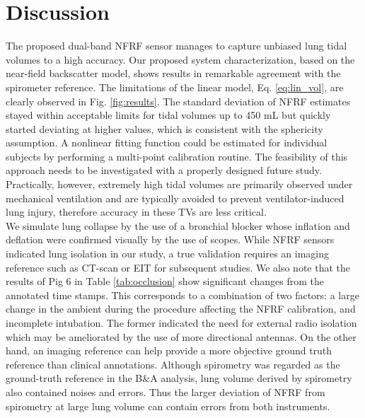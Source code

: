 \documentclass[journal]{IEEEtran}
\begin{document}
\section{Discussion}
The proposed dual-band NFRF sensor manages to capture unbiased lung tidal volumes to a high accuracy. Our proposed system characterization, based on the near-field backscatter model, shows results in remarkable agreement with the spirometer reference. The limitations of the linear model, Eq. \ref{eq:lin_vol}, are clearly observed in Fig. \ref{fig:results}. The standard deviation of NFRF estimates stayed within acceptable limits for tidal volumes up to 450 mL but quickly started deviating at higher values, which is consistent with the sphericity assumption. A nonlinear fitting function could be estimated for individual subjects by performing a multi-point calibration routine. The feasibility of this approach needs to be investigated with a properly designed future study. Practically, however, extremely high tidal volumes are primarily observed under mechanical ventilation and are typically avoided to prevent ventilator-induced lung injury, therefore accuracy in these TVs are less critical.\\
We simulate lung collapse by the use of a bronchial blocker whose inflation and deflation were confirmed visually by the use of scopes. While NFRF sensors indicated lung isolation in our study, a true validation requires an imaging reference such as CT-scan or EIT for subsequent studies. We also note that the results of Pig 6 in Table \ref{tab:occlusion} show significant changes from the annotated time stamps. This corresponds to a combination of two factors: a large change in the ambient during the procedure affecting the NFRF calibration, and incomplete intubation. The former indicated the need for external radio isolation which may be ameliorated by the use of more directional antennas. On the other hand, an imaging reference can help provide a more objective ground truth reference than clinical annotations. Although spirometry was regarded as the ground-truth reference in the B\&A analysis, lung volume derived by spirometry also contained noises and errors.  Thus the larger deviation of NFRF from spirometry at large lung volume can contain errors from both instruments.\\
\end{document}
